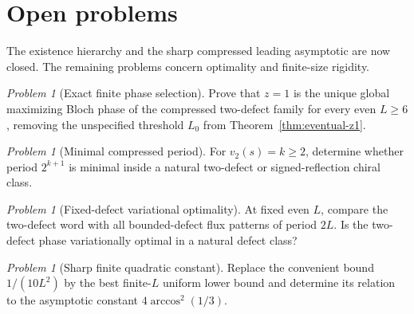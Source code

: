 \documentclass[11pt]{article}
\theoremstyle{remark}
\newtheorem{problem}[theorem]{Problem}
\newcommand{\vTwo}{v_2}
\begin{document}
\section{Open problems}
\label{sec:open}

The existence hierarchy and the sharp compressed leading asymptotic are now
closed.  The remaining problems concern optimality and finite-size rigidity.

\begin{problem}[Exact finite phase selection]
Prove that $z=1$ is the unique global maximizing Bloch phase of the compressed
two-defect family for every even $L\ge6$, removing the unspecified threshold
$L_0$ from Theorem~\ref{thm:eventual-z1}.
\end{problem}

\begin{problem}[Minimal compressed period]
For $\vTwo(s)=k\ge2$, determine whether period $2^{k+1}$ is minimal inside a
natural two-defect or signed-reflection chiral class.
\end{problem}

\begin{problem}[Fixed-defect variational optimality]
At fixed even $L$, compare the two-defect word with all bounded-defect flux
patterns of period $2L$.  Is the two-defect phase variationally optimal in a
natural defect class?
\end{problem}

\begin{problem}[Sharp finite quadratic constant]
Replace the convenient bound $1/(10L^2)$ by the best finite-$L$ uniform lower
bound and determine its relation to the asymptotic constant
$4\arccos^2(1/3)$.
\end{problem}
\end{document}
